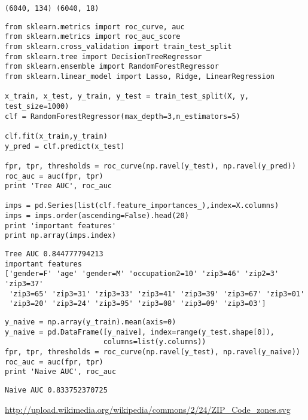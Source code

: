 \documentclass[12pt,fleqn]{article}\usepackage{../common}
\begin{document}
\begin{verbatim}
(6040, 134) (6040, 18)
\end{verbatim}

\begin{verbatim}
from sklearn.metrics import roc_curve, auc
from sklearn.metrics import roc_auc_score
from sklearn.cross_validation import train_test_split
from sklearn.tree import DecisionTreeRegressor
from sklearn.ensemble import RandomForestRegressor
from sklearn.linear_model import Lasso, Ridge, LinearRegression

x_train, x_test, y_train, y_test = train_test_split(X, y, test_size=1000)
clf = RandomForestRegressor(max_depth=3,n_estimators=5)

clf.fit(x_train,y_train)
y_pred = clf.predict(x_test)

fpr, tpr, thresholds = roc_curve(np.ravel(y_test), np.ravel(y_pred))
roc_auc = auc(fpr, tpr)
print 'Tree AUC', roc_auc

imps = pd.Series(list(clf.feature_importances_),index=X.columns)
imps = imps.order(ascending=False).head(20)
print 'important features'
print np.array(imps.index)
\end{verbatim}

\begin{verbatim}
Tree AUC 0.844777794213
important features
['gender=F' 'age' 'gender=M' 'occupation2=10' 'zip3=46' 'zip2=3' 'zip3=37'
 'zip3=65' 'zip3=31' 'zip3=33' 'zip3=41' 'zip3=39' 'zip3=67' 'zip3=01'
 'zip3=20' 'zip3=24' 'zip3=95' 'zip3=08' 'zip3=09' 'zip3=03']
\end{verbatim}

\begin{verbatim}
y_naive = np.array(y_train).mean(axis=0)
y_naive = pd.DataFrame([y_naive], index=range(y_test.shape[0]), 
                       columns=list(y.columns))
fpr, tpr, thresholds = roc_curve(np.ravel(y_test), np.ravel(y_naive))
roc_auc = auc(fpr, tpr)
print 'Naive AUC', roc_auc
\end{verbatim}

\begin{verbatim}
Naive AUC 0.833752370725
\end{verbatim}






















\url{http://upload.wikimedia.org/wikipedia/commons/2/24/ZIP_Code_zones.svg}
\end{document}
